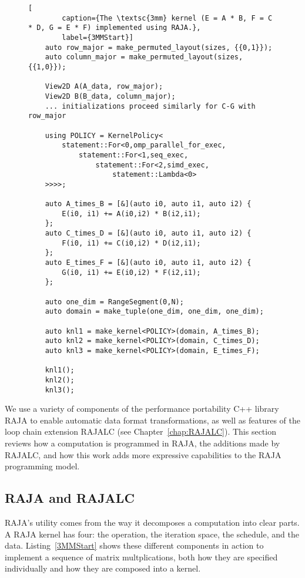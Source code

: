 \begin{figure}
	\begin{lstlisting}[
		caption={The \textsc{3mm} kernel (E = A * B, F = C * D, G = E * F) implemented using RAJA.},
		label={3MMStart}]
	auto row_major = make_permuted_layout(sizes, {{0,1}});
	auto column_major = make_permuted_layout(sizes, {{1,0}});

	View2D A(A_data, row_major);
	View2D B(B_data, column_major);
	... initializations proceed similarly for C-G with row_major

	using POLICY = KernelPolicy<
		statement::For<0,omp_parallel_for_exec,
			statement::For<1,seq_exec,
				statement::For<2,simd_exec,
					statement::Lambda<0>
	>>>>;

	auto A_times_B = [&](auto i0, auto i1, auto i2) {
		E(i0, i1) += A(i0,i2) * B(i2,i1);
	};
	auto C_times_D = [&](auto i0, auto i1, auto i2) {
		F(i0, i1) += C(i0,i2) * D(i2,i1);
	};
	auto E_times_F = [&](auto i0, auto i1, auto i2) {
		G(i0, i1) += E(i0,i2) * F(i2,i1);
	};
	
	auto one_dim = RangeSegment(0,N);
	auto domain = make_tuple(one_dim, one_dim, one_dim);

	auto knl1 = make_kernel<POLICY>(domain, A_times_B);
	auto knl2 = make_kernel<POLICY>(domain, C_times_D);
	auto knl3 = make_kernel<POLICY>(domain, E_times_F);

	knl1();
	knl2();
	knl3();
	\end{lstlisting}
\end{figure}



We use a variety of components of the performance portability C++ library RAJA to enable automatic data format transformations, as well as features of the loop chain extension RAJALC (see Chapter~\ref{chap:RAJALC}).
This section reviews how a computation is programmed in RAJA, the additions made by RAJALC, and how this work adds more expressive capabilities to the RAJA programming model.

\subsection{RAJA and RAJALC}

RAJA's utility comes from the way it decomposes a computation into clear parts.
A RAJA kernel has four: the operation, the iteration space, the schedule, and the data. 
Listing~\ref{3MMStart} shows these different components in action to implement a sequence of matrix multplications, both how they are specified individually and how they are composed into a kernel.

